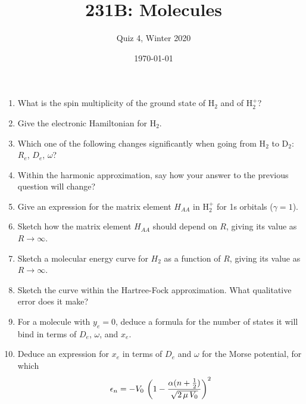 




\title{231B: Molecules}
\author{Quiz 4, Winter 2020}
\date{\today}
\maketitle

\begin{enumerate}

\item What is the spin multiplicity of the ground state of H$_2$ and of H$_2^+$?

\item Give the electronic Hamiltonian for H$_2$.

\item Which one of the following changes significantly when going from H$_2$
to D$_2$:  $R_e$, $D_e$, $\omega$?

\item Within the harmonic approximation, say how your answer to the previous
question will change?

\item Give an expression for the matrix element $H_{AA}$ in H$_2^+$ for
1s orbitals ($\gamma=1$).

\item Sketch how the matrix element $H_{AA}$ should depend on $R$, giving its
value as $R\to\infty$.

\item Sketch a molecular energy curve for $H_2$ as a function of $R$,
giving its value as $R\to\infty$.

\item Sketch the curve within the Hartree-Fock approximation.  
What qualitative error does it make?

\item For a molecule with $y_e=0$, deduce a formula for the number of
states it will bind in terms of $D_e$, $\omega$, and $x_e$.

\item Deduce an expression for $x_e$ in terms of $D_e$ and $\omega$
for the Morse potential, for which 
$$
\epsilon_n = -V_0\, \left( 1 - \frac{\alpha (n+\frac{1}{2})}{\sqrt{2\, \mu\, V_0}} \right)^2
$$

\end{enumerate}

